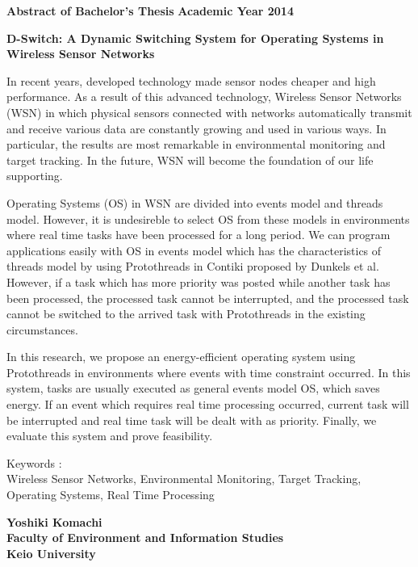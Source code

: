 \newpage

\begin{center}
\textbf{\Large Abstract of Bachelor's Thesis}
\textbf{\Large Academic Year 2014}
\vspace{6.18mm}

\textbf{\Large D-Switch: A Dynamic Switching System for Operating Systems in Wireless Sensor Networks}
\end{center}

\vspace{10mm}

In recent years, 
developed technology made 
sensor nodes cheaper and high performance.
As a result of this advanced technology, 
Wireless Sensor Networks (WSN) 
in which physical sensors connected with networks
automatically transmit and receive various data 
are constantly growing and used in various ways.
In particular, the results are most remarkable
in environmental monitoring and target tracking.
In the future, WSN will become the foundation of our life supporting. 

Operating Systems (OS) in WSN
are divided into events model and threads model.
However, it is undesireble to 
select OS from these models  
in environments where 
real time tasks have been processed 
for a long period.
We can program applications easily
with OS
in events model which
has the characteristics of threads model
by using Protothreads\cite{Dunkels:2006:PSE:1182807.1182811} 
in Contiki\cite{Dunkels:2004:CLF:1032658.1034117}
proposed by Dunkels et al.
However, 
if a task which has more priority was posted 
while another task has been processed,
the processed task cannot be interrupted,
and the processed task cannot be switched to the arrived task 
with Protothreads
in the existing circumstances.

In this research, we propose an energy-efficient operating system 
using Protothreads
in environments where events with time constraint occurred.
In this system,
tasks are usually executed as general events model OS, 
which saves energy.
If an event which requires real time processing occurred,
current task will be interrupted and 
real time task will be dealt with as priority.
Finally, we evaluate this system and prove feasibility.


\vspace{10mm}
Keywords :\\
\hspace{3.5em}Wireless Sensor Networks, Environmental Monitoring, Target Tracking, Operating Systems, Real Time Processing 
\begin{flushright}
\textbf{Yoshiki Komachi}\\
\vspace{5mm}
\textbf{Faculty of Environment and Information Studies}\\
\textbf{Keio University}
\end{flushright}
